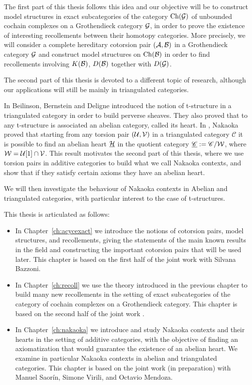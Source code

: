 The first part of this thesis follows this idea and our objective will be to construct model structures in exact subcategories of the category $\mathrm{Ch}(\mathcal{G})$ of unbounded cochain complexes on a Grothendieck category $\mathcal{G}$, in order to prove the existence of interesting recollements between their homotopy categories. More precisely, we will consider a complete hereditary cotorsion pair $(\mathcal{A},\mathcal{B})$ in a Grothendieck category $\mathcal{G}$ and construct model structures on $\mathrm{Ch}(\mathcal{B})$ in order to find recollements involving $K(\mathcal{B})$, $D(\mathcal{B})$ together with $D(\mathcal{G})$.

The second part of this thesis is devoted to a different topic of research, although our applications will still be mainly in triangulated categories.

In \cite{bbd82} Beilinson, Bernstein and Deligne introduced the notion of t-structure in a triangulated category in order to build perverse sheaves. They also proved that to any t-structure is associated an abelian category, called its heart. In \cite{Nakaoka}, Nakaoka proved that starting from any torsion pair $(\mathcal{U},\mathcal{V})$ in a triangulated category $\mathscr{C}$ it is possible to find an abelian heart $\underline{\mathcal{H}}$ in the quotient category $\underline{\mathscr{C}}:=\mathscr{C}/\mathcal{W}$, where $\mathcal{W}=\mathcal{U}[1]\cap\mathcal{V}$. This result motivates the second part of this thesis, where we use torsion pairs in additive categories to build what we call Nakaoka contexts, and show that if they satisfy certain axioms they have an abelian heart.

We will then investigate the behaviour of Nakaoka contexts in Abelian and triangulated categories, with particular interest to the case of t-structures.

\medskip

This thesis is articulated as follows:
\begin{itemize}
  \item In Chapter~\ref{ch:acycexact} we introduce the notions of cotorsion pairs, model structures, and recollements, giving the statements of the main known results in the field and constructing the important cotorsion pairs that will be used later. This chapter is based on the first half of the joint work \cite{bazzoni2018recollements} with Silvana Bazzoni.
  \item In Chapter~\ref{ch:recoll} we use the theory introduced in the previous chapter to build many new recollements in the setting of exact subcategories of the category of cochain complexes on a Grothendieck category. This chapter is based on the second half of the joint work \cite{bazzoni2018recollements}.
  \item In Chapter~\ref{ch:nakaoka} we introduce and study Nakaoka contexts and their hearts in the setting of additive categories, with the objective of finding an axiomatization that would guarantee the existence of an abelian heart. We examine in particular Nakaoka contexts in abelian and triangulated categories. This chapter is based on the joint work (in preparation) \cite{mstv2018} with Manuel Saor\'in, Simone Virili, and Octavio Mendoza.
\end{itemize}

